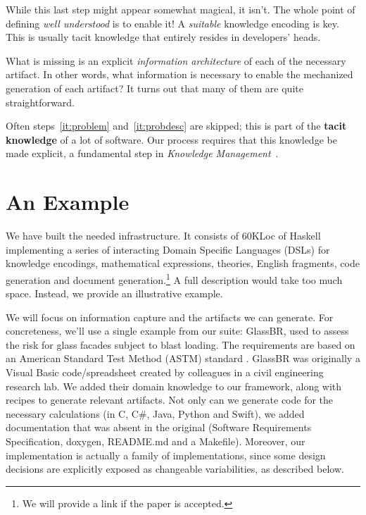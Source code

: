 \documentclass[a4paper,UKenglish,cleveref,autoref,thm-restate]{oasics-v2021}
\newcommand{\CC}{C\nolinebreak\hspace{-.05em}\raisebox{.4ex}{\small\bf +}\nolinebreak\hspace{-.10em}\raisebox{.4ex}{\small\bf +}}
\begin{document}
While this last step might appear somewhat magical, it isn't. The whole point of
defining \emph{well understood} is to enable it! A \emph{suitable} knowledge
encoding is key. This is usually tacit knowledge that entirely resides in
developers' heads.

What is missing is an explicit \emph{information architecture} of each of the
necessary artifact. In other words, what information is necessary to enable the
mechanized generation of each artifact? It turns out that many of them are quite
straightforward.

Often steps~\ref{it:problem} and~\ref{it:probdesc} are skipped; this is
part of the \textbf{tacit knowledge} of a lot
of software.  Our process requires that this knowledge be made explicit,
a fundamental step in \emph{Knowledge Management}~\cite{Dalkir2011}.


\section{An Example}
\label{sec:example}

We have built the needed infrastructure. It consists of 60KLoc of Haskell
implementing a series of interacting Domain Specific Languages (DSLs) for
knowledge encodings, mathematical expressions, theories, English fragments,
code generation and document generation.\footnote{We will provide a link
if the paper is accepted.} A full description would take too much space.
Instead, we provide an illustrative example.

We will focus on information capture and the artifacts we can generate. For
concreteness, we'll use a single example from our suite: GlassBR, used to assess
the risk for glass facades subject to blast loading. The requirements are based
on an American Standard Test Method (ASTM) standard \cite{BeasonEtAl1998,
ASTM2009, ASTM2015}. GlassBR was originally a Visual Basic code/spreadsheet
created by colleagues in a civil engineering research lab.  We added their
domain knowledge to our framework, along with recipes to generate relevant
artifacts.  Not only can we generate code for the necessary calculations (in
\CC, C\#, Java, Python and Swift), we added documentation that was absent in the
original (Software Requirements Specification, doxygen, README.md and a
Makefile). Moreover, our implementation is actually a family of implementations,
since some design decisions are explicitly exposed as changeable variabilities,
as described below.
\end{document}
